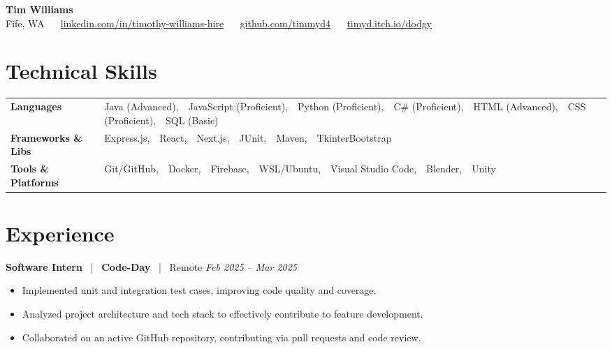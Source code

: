 \documentclass[10pt, letterpaper]{article}
\newcommand{\jobhead}[4]{%
  \vspace{5pt}%
  {\bfseries\color{dark}#1}%
  ~{\color{light}|}~%
  {\bfseries\color{navy}#2}%
  ~{\color{light}|}~%
  {\color{light}#3}%
  \hfill{\color{light}\small\textit{#4}}\\[-2pt]%
}
\newcommand{\skillrow}[2]{%
  {\bfseries #1} & #2 \\[2pt]%
}
\begin{document}

\begin{center}
  {\huge\bfseries\color{navy} Tim Williams}\\[4pt]
  {\small\color{light}
    Fife, WA
    ~\textbullet~
    \href{https://linkedin.com/in/timothy-williams-hire}{linkedin.com/in/timothy-williams-hire}
    ~\textbullet~
    \href{https://github.com/timmyd4}{github.com/timmyd4}
    ~\textbullet~
    \href{https://timyd.itch.io/dodgy}{timyd.itch.io/dodgy}
  }
\end{center}

\vspace{2pt}

\section{Technical Skills}

\begin{tabular}{@{}p{1.6in} p{5.2in}@{}}
  \skillrow{Languages}{Java (Advanced),\ \ JavaScript (Proficient),\ \ Python (Proficient),\ \ C\# (Proficient),\ \ HTML (Advanced),\ \ CSS (Proficient),\ \ SQL (Basic)}
  \skillrow{Frameworks \& Libs}{Express.js,\ \ React,\ \ Next.js,\ \ JUnit,\ \ Maven,\ \ TkinterBootstrap}
  \skillrow{Tools \& Platforms}{Git/GitHub,\ \ Docker,\ \ Firebase,\ \ WSL/Ubuntu,\ \ Visual Studio Code,\ \ Blender,\ \ Unity}
\end{tabular}

\section{Experience}

\jobhead{Software Intern}{Code-Day}{Remote}{Feb 2025 – Mar 2025}
\begin{itemize}
  \item Implemented unit and integration test cases, improving code quality and coverage.
  \item Analyzed project architecture and tech stack to effectively contribute to feature development.
  \item Collaborated on an active GitHub repository, contributing via pull requests and code review.
\end{itemize}
\end{document}
